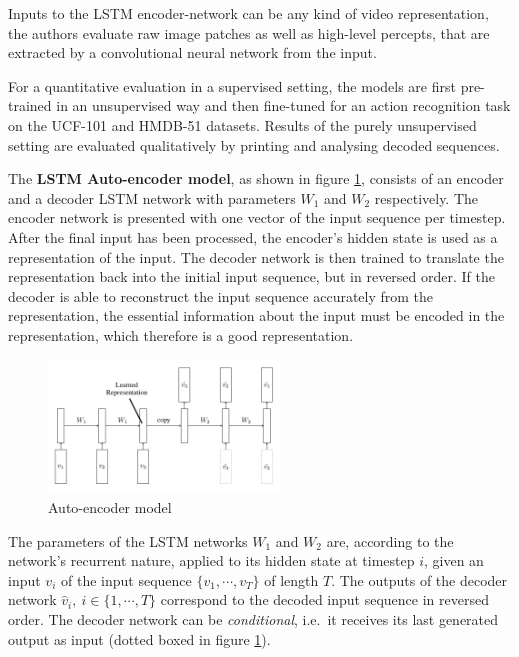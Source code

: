 Inputs to the LSTM encoder-network can be any kind of video representation, the authors evaluate raw image patches as well as high-level percepts, that are extracted by a convolutional neural network from the input. 

For a quantitative evaluation in a supervised setting, the models are first pre-trained in an unsupervised way and then fine-tuned for an action recognition task on the UCF-101 and HMDB-51 datasets.
Results of the purely unsupervised setting are evaluated qualitatively by printing and analysing decoded sequences.

The \textbf{LSTM Auto-encoder model}, as shown in figure \ref{fig:unsupervisedlstms_autoencoder}, consists of an encoder and a decoder LSTM network with parameters $W_1$ and $W_2$ respectively.
The encoder network is presented with one vector of the input sequence per timestep.
After the final input has been processed, the encoder's hidden state is used as a representation of the input.
The decoder network is then trained to translate the representation back into the initial input sequence, but in reversed order.
If the decoder is able to reconstruct the input sequence accurately from the representation, the essential information about the input must be encoded in the representation, which therefore is a good representation.

\begin{figure}[H]
    \centering
    \includegraphics[width=0.55\textwidth]{img_deep/unsupervisedlstms_autoencoder}
    \caption{Auto-encoder model \cite{srivastava_unsupervised_2015}}
    \label{fig:unsupervisedlstms_autoencoder}
\end{figure}

The parameters of the LSTM networks $W_1$ and $W_2$ are, according to the network's recurrent nature, applied to its hidden state at timestep $i$, given an input $v_i$ of the input sequence $\{v_1, \cdots, v_T\}$ of length $T$.
The outputs of the decoder network $\hat{v}_i,\ i \in \{1,\cdots,T\}$ correspond to the decoded input sequence in reversed order.
The decoder network can be \textit{conditional}, i.e.\ it receives its last generated output as input (dotted boxed in figure \ref{fig:unsupervisedlstms_autoencoder}).


